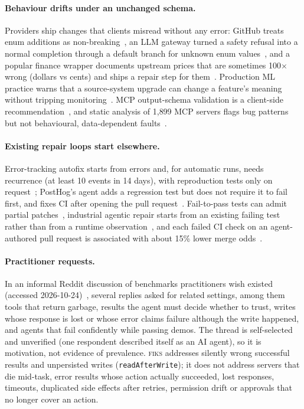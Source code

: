 \documentclass[10pt]{article}
\newcommand{\fiks}{\textsc{fiks}}
\begin{document}
\paragraph{Behaviour drifts under an unchanged schema.} Providers ship changes that clients misread without any error: GitHub treats enum additions as non-breaking~\cite{github-breaking-changes}, an LLM gateway turned a safety refusal into a normal completion through a default branch for unknown enum values~\cite{litellm-23899}, and a popular finance wrapper documents upstream prices that are sometimes 100$\times$ wrong (dollars vs cents) and ships a repair step for them~\cite{yfinance-price-repair}. Production ML practice warns that a source-system upgrade can change a feature's meaning without tripping monitoring~\cite{breck2017mltestscore}. MCP output-schema validation is a client-side recommendation~\cite{mcp-spec-2026-07-28-tools}, and static analysis of 1{,}899 MCP servers flags bug patterns but not behavioural, data-dependent faults~\cite{hasan2025mcpfirstglance}.

\paragraph{Existing repair loops start elsewhere.} Error-tracking autofix starts from errors and, for automatic runs, needs recurrence (at least 10 events in 14 days), with reproduction tests only on request~\cite{sentry-seer-issue-fix}; PostHog's agent adds a regression test but does not require it to fail first, and fixes CI after opening the pull request~\cite{posthog-anatomy-pr}. Fail-to-pass tests can admit partial patches~\cite{swe-doctor}, industrial agentic repair starts from an existing failing test rather than from a runtime observation~\cite{maddila2025metaagent}, and each failed CI check on an agent-authored pull request is associated with about 15\% lower merge odds~\cite{ehsani2026failedagenticprs}.

\paragraph{Practitioner requests.} In an informal Reddit discussion of benchmarks practitioners wish existed (accessed 2026-10-24)~\cite{reddit2026benchmarkwish}, several replies asked for related settings, among them tools that return garbage, results the agent must decide whether to trust, writes whose response is lost or whose error claims failure although the write happened, and agents that fail confidently while passing demos. The thread is self-selected and unverified (one respondent described itself as an AI agent), so it is motivation, not evidence of prevalence. \fiks{} addresses silently wrong successful results and unpersisted writes (\texttt{readAfterWrite}); it does not address servers that die mid-task, error results whose action actually succeeded, lost responses, timeouts, duplicated side effects after retries, permission drift or approvals that no longer cover an action.
\end{document}
